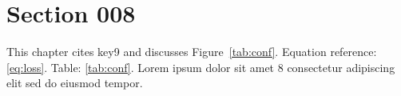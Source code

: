 \section{Section 008}\label{sec:s8}
This chapter cites key9 and discusses Figure~\ref{tab:conf}.
Equation reference: \eqref{eq:loss}. Table: \ref{tab:conf}.
Lorem ipsum dolor sit amet 8 consectetur adipiscing elit sed do eiusmod tempor.
